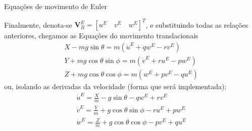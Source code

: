 \documentclass{beamer}
\newcommand{\jindent}{\justifying\setlength{\parindent}{1.5em}}
\begin{document}
\begin{frame}{Equações de movimento de Euler}

    \jindent
    Finalmente, denota-se $\mathbf V_B^E = [u^E \quad v^E \quad w^E]^T$, e substituindo todas as relações anteriores, chegamos as Equações do movimento translacionais
    \begin{gather*}
    X - mg \sin \theta = m(\dot{u}^E + q w^E - r v^E) \\
    Y + mg \cos \theta \sin \phi = m(\dot{v}^E + r u^E - p w^E) \\
    Z + mg \cos \theta \cos \phi = m(w^E + p v^E - q u^E)
    \end{gather*}
    \justifying ou, isolando as derivadas da velocidade (forma que será implementada):
    \begin{gather*}
        \dot{u}^E = \frac{X}{m} - g \sin\theta - q w^E + r v^E \\
        \dot{v}^E = \frac{Y}{m} + g \cos\theta \sin\phi - r u^E + p w^E \\
        \dot{w}^E = \frac{Z}{m} + g \cos\theta \cos\phi - p v^E + q u^E
    \end{gather*}

\end{frame}
\end{document}
